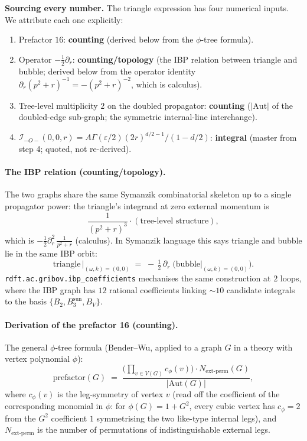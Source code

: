 \documentclass[11pt,a4paper]{article}
\begin{document}
\begin{cfacbox}
\textbf{Sourcing every number.} The triangle expression has four numerical inputs.
We attribute each one explicitly:
\begin{enumerate}[itemsep=2pt,leftmargin=2em,label=(\alph*)]
\item Prefactor $\boxed{16}$: \textbf{counting} (derived below from the $\phi$-tree
formula).
\item Operator $\boxed{-\tfrac{1}{2}\partial_{r}}$: \textbf{counting/topology} (the IBP
relation between triangle and bubble; derived below from the operator identity
$\partial_{r}(p^{2}+r)^{-1} = -(p^{2}+r)^{-2}$, which is calculus).
\item Tree-level multiplicity $\boxed{2}$ on the doubled propagator: \textbf{counting}
($|\mathrm{Aut}|$ of the doubled-edge sub-graph; the symmetric internal-line interchange).
\item $\mathcal I_{-O-}(0,0,r) = A\Gamma(\varepsilon/2)(2r)^{d/2-1}/(1-d/2)$:
\textbf{integral} (master from step 4; quoted, not re-derived).
\end{enumerate}

\paragraph{The IBP relation (counting/topology).} The two graphs share the same Symanzik
combinatorial skeleton up to a single propagator power: the triangle's integrand at zero
external momentum is
\[
\frac{1}{(p^{2}+r)^{3}} \cdot (\text{tree-level structure}),
\]
which is $-\tfrac{1}{2}\partial_{r}^{2}\,\frac{1}{p^{2}+r}$ (calculus). In Symanzik
language this says triangle and bubble lie in the same IBP orbit:
\[
\boxed{\;\text{triangle}\,\big|_{(\omega,k)=(0,0)}
\;=\; -\,\tfrac{1}{2}\,\partial_{r}\;\bigl(\text{bubble}\big|_{(\omega,k)=(0,0)}\bigr).\;}
\]
\texttt{rdft.ac.gribov.ibp\_coefficients} mechanises the same construction at $2$ loops,
where the IBP graph has $12$ rational coefficients linking $\sim 10$ candidate integrals
to the basis $\{B_{2}, B_{3}^{\text{sun}}, B_{V}\}$.

\paragraph{Derivation of the prefactor 16 (counting).} The general $\phi$-tree
formula (Bender--Wu, applied to a graph $G$ in a theory with vertex polynomial $\phi$):
\[
\boxed{\;
\text{prefactor}(G) \;=\; \frac{\bigl(\prod_{v\in V(G)} c_{\phi}(v)\bigr)\cdot N_{\text{ext-perm}}(G)}{|\mathrm{Aut}(G)|},
\;}
\]
where $c_{\phi}(v)$ is the leg-symmetry of vertex $v$ (read off the coefficient of the
corresponding monomial in $\phi$: for $\phi(G)=1+G^{2}$, every cubic vertex has
$c_{\phi}=2$ from the $G^{2}$ coefficient $1$ symmetrising the two like-type internal
legs), and $N_{\text{ext-perm}}$ is the number of permutations of indistinguishable
external legs.


\end{cfacbox}
\end{document}
